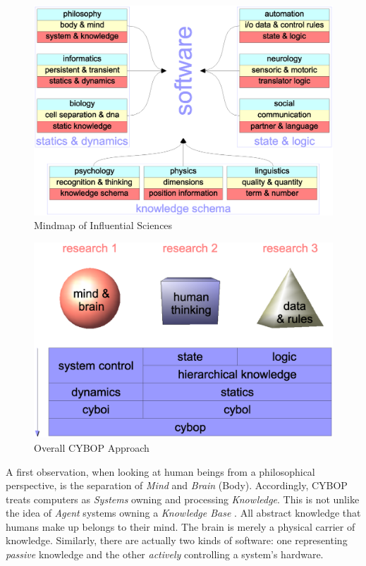 \begin{figure}[ht]
    \begin{center}
        \includegraphics[scale=0.2]{vector/mindmap.eps}
        \caption{Mindmap of Influential Sciences}
        \label{mindmap_figure}
    \end{center}
\end{figure}

\begin{figure}[ht]
    \begin{center}
        \includegraphics[scale=0.2]{vector/approach.eps}
        \caption{Overall CYBOP Approach}
        \label{approach_figure}
    \end{center}
\end{figure}

A first observation, when looking at human beings from a philosophical
perspective, is the separation of \emph{Mind} and \emph{Brain} (Body).
Accordingly, CYBOP treats computers as \emph{Systems} owning and processing
\emph{Knowledge}. This is not unlike the idea of \emph{Agent} systems owning a
\emph{Knowledge Base} \cite{parks, kuehnel}. All abstract knowledge that humans
make up belongs to their mind. The brain is merely a physical carrier of
knowledge. Similarly, there are actually two kinds of software: one
representing \emph{passive} knowledge and the other \emph{actively} controlling
a system's hardware.

